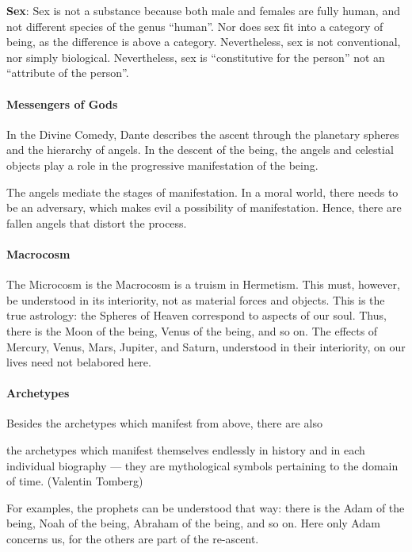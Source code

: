 \textbf{Sex}: Sex is not a substance because both male and females are fully human, and not different species of the genus “human”. Nor does sex fit into a category of being, as the difference is above a category. Nevertheless, sex is not conventional, nor simply biological. Nevertheless, sex is “constitutive for the person” not an “attribute of the person”.

\paragraph{Messengers of Gods}
In the Divine Comedy, Dante describes the ascent through the planetary spheres and the hierarchy of angels. In the descent of the being, the angels and celestial objects play a role in the progressive manifestation of the being.

The angels mediate the stages of manifestation. In a moral world, there needs to be an adversary, which makes evil a possibility of manifestation. Hence, there are fallen angels that distort the process.

\paragraph{Macrocosm}
The Microcosm is the Macrocosm is a truism in Hermetism. This must, however, be understood in its interiority, not as material forces and objects. This is the true astrology: the Spheres of Heaven correspond to aspects of our soul. Thus, there is the Moon of the being, Venus of the being, and so on. The effects of Mercury, Venus, Mars, Jupiter, and Saturn, understood in their interiority, on our lives need not belabored here.

\paragraph{Archetypes}
Besides the archetypes which manifest from above, there are also

\begin{quotex}
the archetypes which manifest themselves endlessly in history and in each individual biography — they are mythological symbols pertaining to the domain of time. (Valentin Tomberg) 

\end{quotex}
For examples, the prophets can be understood that way: there is the Adam of the being, Noah of the being, Abraham of the being, and so on. Here only Adam concerns us, for the others are part of the re-ascent.

